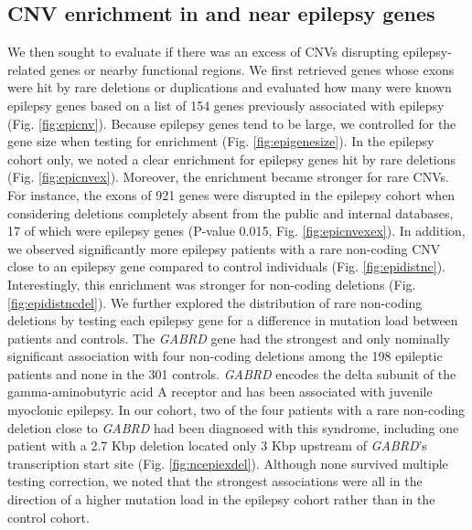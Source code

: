 \subsection*{CNV enrichment in and near epilepsy genes}
We then sought to evaluate if there was an excess of CNVs disrupting epilepsy-related genes or nearby functional regions.
We first retrieved genes whose exons were hit by rare deletions or duplications and evaluated how many were known epilepsy genes based on a list of 154 genes previously associated with epilepsy\cite{Ran2015} (Fig. \ref{fig:epicnv}).
Because epilepsy genes tend to be large, we controlled for the gene size when testing for enrichment (Fig. \ref{fig:epigenesize}).
In the epilepsy cohort only, we noted a clear enrichment for epilepsy genes hit by rare deletions (Fig. \ref{fig:epicnvex}).
Moreover, the enrichment became stronger for rare CNVs.
For instance, the exons of 921 genes were disrupted in the epilepsy cohort when considering deletions completely absent from the public and internal databases, 17 of which were epilepsy genes (P-value 0.015, Fig. \ref{fig:epicnvexex}).
In addition, we observed significantly more epilepsy patients with a rare non-coding CNV close to an epilepsy gene compared to control individuals (Fig. \ref{fig:epidistnc}).
Interestingly, this enrichment was stronger for non-coding deletions (Fig. \ref{fig:epidistncdel}).
We further explored the distribution of rare non-coding deletions by testing each epilepsy gene for a difference in mutation load between patients and controls.
The {\it GABRD} gene had the strongest and only nominally significant association with four non-coding deletions among the 198 epileptic patients and none in the 301 controls.
{\it GABRD} encodes the delta subunit of the gamma-aminobutyric acid A receptor and has been associated with juvenile myoclonic epilepsy\cite{Delgado-Escueta2013}.
In our cohort, two of the four patients with a rare non-coding deletion close to {\it GABRD} had been diagnosed with this syndrome, including one patient with a 2.7 Kbp deletion located only 3 Kbp upstream of {\it GABRD}'s transcription start site (Fig. \ref{fig:ncepiexdel}).
Although none survived multiple testing correction, we noted that the strongest associations were all in the direction of a higher mutation load in the epilepsy cohort rather than in the control cohort.

